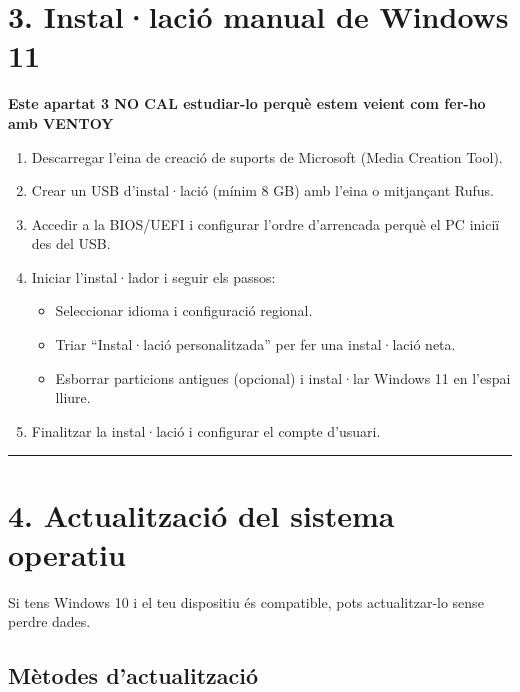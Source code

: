 \documentclass[
  12 pt,
  a4paper,
]{article}
\providecommand{\tightlist}{%
  \setlength{\itemsep}{0pt}\setlength{\parskip}{0pt}}
\begin{document}
\section{3. Instal·lació manual de Windows
11}\label{installaciuxf3-manual-de-windows-11}

\textbf{Este apartat 3 NO CAL estudiar-lo perquè estem veient com fer-ho
amb VENTOY}

\begin{enumerate}
\def\labelenumi{\arabic{enumi}.}
\item
  Descarregar l'eina de creació de suports de Microsoft (Media Creation
  Tool).
\item
  Crear un USB d'instal·lació (mínim 8 GB) amb l'eina o mitjançant
  Rufus.
\item
  Accedir a la BIOS/UEFI i configurar l'ordre d'arrencada perquè el PC
  iniciï des del USB.
\item
  Iniciar l'instal·lador i seguir els passos:

  \begin{itemize}
  \tightlist
  \item
    Seleccionar idioma i configuració regional.\\
  \item
    Triar ``Instal·lació personalitzada'' per fer una instal·lació
    neta.\\
  \item
    Esborrar particions antigues (opcional) i instal·lar Windows 11 en
    l'espai lliure.\\
  \end{itemize}
\item
  Finalitzar la instal·lació i configurar el compte d'usuari.
\end{enumerate}

\begin{center}\rule{0.5\linewidth}{0.5pt}\end{center}

\section{4. Actualització del sistema
operatiu}\label{actualitzaciuxf3-del-sistema-operatiu}

Si tens Windows 10 i el teu dispositiu és compatible, pots
actualitzar-lo sense perdre dades.

\subsection{Mètodes d'actualització}\label{muxe8todes-dactualitzaciuxf3}
\end{document}
